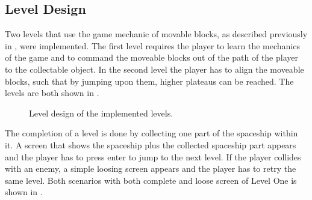 \subsection{Level Design}\label{sec:game_design_level}
Two levels that use the game mechanic of movable blocks, as described previously in , were implemented.
The first level requires the player to learn the mechanics of the game and to command the moveable blocks out of the path of the player to the collectable object.
In the second level the player has to align the moveable blocks, such that by jumping upon them, higher plateaus can be reached.
The levels are both shown in .
\begin{figure}[!ht]
  \centering
  \qquad
  \caption{Level design of the implemented levels.}
  \label{fig:game_design_level}
\end{figure}
\FloatBarrier
\noindent
The completion of a level is done by collecting one part of the spaceship within it.
A screen that shows the spaceship plus the collected spaceship part appears and the player has to press enter to jump to the next level.
If the player collides with an enemy, a simple loosing screen appears and the player has to retry the same level.
Both scenarios with both complete and loose screen of Level One is shown in .
